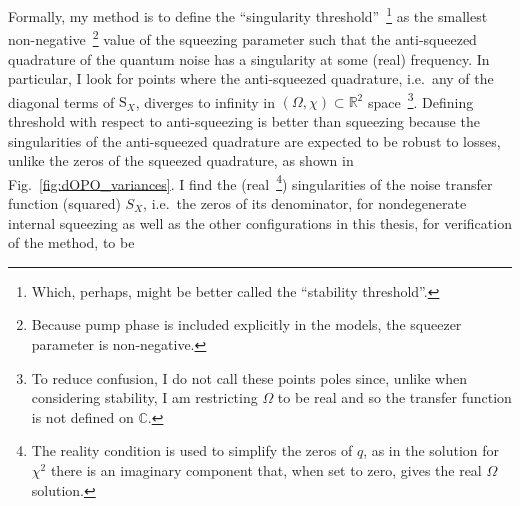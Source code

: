 Formally, my method is to define the ``singularity threshold''~\footnote{Which, perhaps, might be better called the ``stability threshold''.} as the smallest non-negative~\footnote{Because pump phase is included explicitly in the models, the squeezer parameter is non-negative.} value of the squeezing parameter such that the anti-squeezed quadrature of the quantum noise has a singularity at some (real) frequency. In particular, I look for points where the anti-squeezed quadrature, i.e.\ any of the diagonal terms of $\text{S}_X$, diverges to infinity in $(\Omega,\chi)\subset\mathbb{R}^2$ space~\footnote{To reduce confusion, I do not call these points poles since, unlike when considering stability, I am restricting $\Omega$ to be real and so the transfer function is not defined on $\mathbb{C}$.}. %
Defining threshold with respect to anti-squeezing is better than squeezing because the singularities of the anti-squeezed quadrature are expected to be robust to losses, unlike the zeros of the squeezed quadrature, as shown in Fig.~\ref{fig:dOPO_variances}. 
I find the (real~\footnote{The reality condition is used to simplify the zeros of $q$, as in the solution for $\chi^2$ there is an imaginary component that, when set to zero, gives the real $\Omega$ solution.}) singularities of the noise transfer function (squared) $S_X$, i.e.\ the zeros of its denominator, for nondegenerate internal squeezing as well as the other configurations in this thesis, for verification of the method, to be
\begingroup
\allowdisplaybreaks
